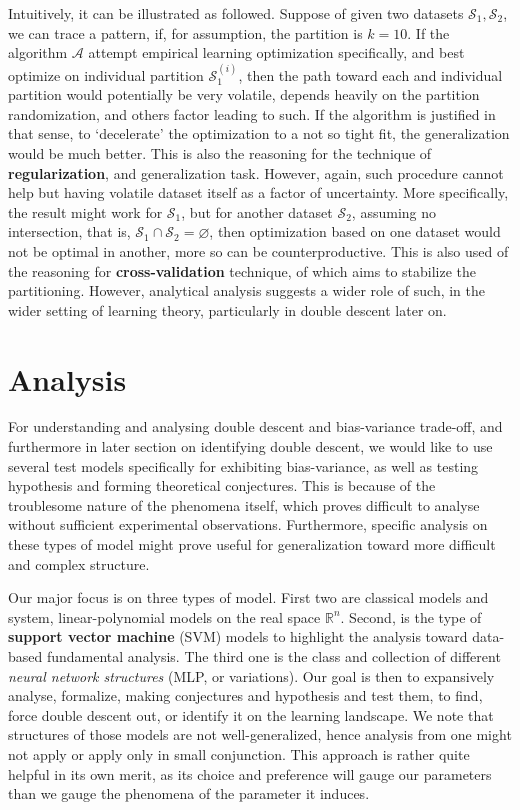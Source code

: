 \documentclass[10pt]{article} %
\begin{document}
Intuitively, it can be illustrated as followed. Suppose of given two datasets $\mathcal{S}_{1},\mathcal{S}_{2}$, we can trace a pattern, if, for assumption, the partition is $k=10$. If the algorithm $\mathcal{A}$ attempt empirical learning optimization specifically, and best optimize on individual partition $\mathcal{S}_{1}^{(i)}$, then the path toward each and individual partition would potentially be very volatile, depends heavily on the partition randomization, and others factor leading to such. If the algorithm is justified in that sense, to `decelerate' the optimization to a not so tight fit, the generalization would be much better. This is also the reasoning for the technique of \textbf{regularization}, and generalization task. However, again, such procedure cannot help but having volatile dataset itself as a factor of uncertainty. More specifically, the result might work for $\mathcal{S}_{1}$, but for another dataset $\mathcal{S}_{2}$, assuming no intersection, that is, $\mathcal{S}_{1}\cap \mathcal{S}_{2}=\varnothing$, then optimization based on one dataset would not be optimal in another, more so can be counterproductive. This is also used of the reasoning for \textbf{cross-validation} technique, of which aims to stabilize the partitioning. However, analytical analysis suggests a wider role of such, in the wider setting of learning theory, particularly in double descent later on. 

\clearpage

\section{Analysis}

For understanding and analysing double descent and bias-variance trade-off, and furthermore in later section on identifying double descent, we would like to use several test models specifically for exhibiting bias-variance, as well as testing hypothesis and forming theoretical conjectures. This is because of the troublesome nature of the phenomena itself, which proves difficult to analyse without sufficient experimental observations. Furthermore, specific analysis on these types of model might prove useful for generalization toward more difficult and complex structure. 

Our major focus is on three types of model. First two are classical models and system, linear-polynomial models on the real space $\mathbb{R}^{n}$. Second, is the type of \textbf{support vector machine} (SVM) models to highlight the analysis toward data-based fundamental analysis. The third one is the class and collection of different \textit{neural network structures} (MLP, or variations). Our goal is then to expansively analyse, formalize, making conjectures and hypothesis and test them, to find, force double descent out, or identify it on the learning landscape. We note that structures of those models are not well-generalized, hence analysis from one might not apply or apply only in small conjunction. This approach is rather quite helpful in its own merit, as its choice and preference will gauge our parameters than we gauge the phenomena of the parameter it induces. 
\end{document}
